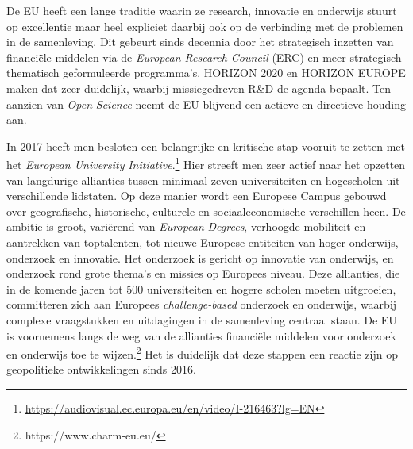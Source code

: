 \documentclass[smallauthor, chapterhaspagenum, nochapterinheader, pagenuminheader,  bigchapnum,medium2, tocpages,  garamond, titleinheader]{jote-book}
\begin{document}
	De EU heeft een lange traditie waarin ze research, innovatie en onderwijs stuurt op excellentie maar heel expliciet daarbij ook op de verbinding met de problemen in de samenleving. Dit gebeurt sinds decennia door het strategisch inzetten van financiële middelen via de \emph{European Research Council} (ERC) en meer strategisch thematisch geformuleerde programma's. HORIZON 2020 en HORIZON EUROPE maken dat zeer duidelijk, waarbij missiegedreven R\&D de agenda bepaalt. Ten aanzien van \emph{Open }\emph{Science} neemt de EU blijvend een actieve en directieve houding aan.



	In 2017 heeft men besloten een belangrijke en kritische stap vooruit te zetten met het \emph{European University }\emph{Initiative}.\footnote{\href{https://audiovisual.ec.europa.eu/en/video/I-216463?lg=EN}{https://audiovisual.ec.europa.eu/en/video/I-216463?lg=EN}} Hier streeft men zeer actief naar het opzetten van langdurige allianties tussen minimaal zeven universiteiten en hogescholen uit verschillende lidstaten. Op deze manier wordt een Europese Campus gebouwd over geografische, historische, culturele en sociaaleconomische verschillen heen. De ambitie is groot, variërend van \emph{European }\emph{Degrees}, verhoogde mobiliteit en aantrekken van toptalenten, tot nieuwe Europese entiteiten van hoger onderwijs, onderzoek en innovatie. Het onderzoek is gericht op innovatie van onderwijs, en onderzoek rond grote thema's en missies op Europees niveau. Deze allianties, die in de komende jaren tot 500 universiteiten en hogere scholen moeten uitgroeien, committeren zich aan Europees \emph{challenge-based} onderzoek en onderwijs, waarbij complexe vraagstukken en uitdagingen in de samenleving centraal staan. De EU is voornemens langs de weg van de allianties financiële middelen voor onderzoek en onderwijs toe te wijzen.\footnote{https://www.charm-eu.eu/} Het is duidelijk dat deze stappen een reactie zijn op geopolitieke ontwikkelingen sinds 2016.
\end{document}
